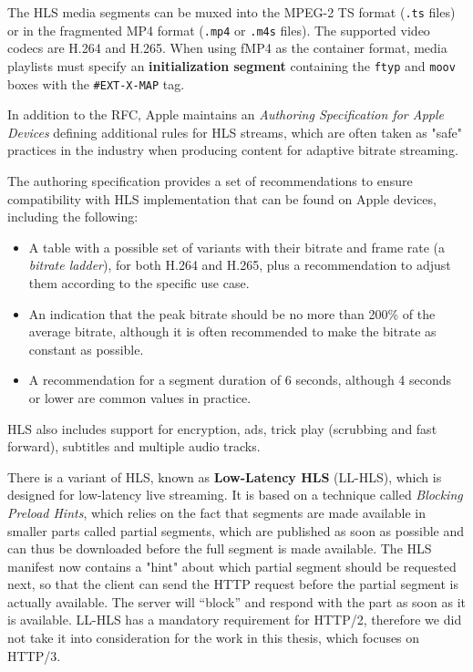 The HLS media segments can be muxed into the MPEG-2 TS format (\texttt{.ts} files) or in the fragmented MP4 format (\texttt{.mp4} or \texttt{.m4s} files). The supported video codecs are H.264 and H.265. When using fMP4 as the container format, media playlists must specify an \textbf{initialization segment} containing the \texttt{ftyp} and \texttt{moov} boxes with the \texttt{\#EXT-X-MAP} tag.

In addition to the RFC, Apple maintains an \textit{Authoring Specification for Apple Devices} defining additional rules for HLS streams, which are often taken as "safe" practices in the industry when producing content for adaptive bitrate streaming.\cite{hlsauthoring}

The authoring specification provides a set of recommendations to ensure compatibility with HLS implementation that can be found on Apple devices, including the following:

\begin{itemize}
    \item A table with a possible set of variants with their bitrate and frame rate (a \textit{bitrate ladder}), for both H.264 and H.265, plus a recommendation to adjust them according to the specific use case.
    \item An indication that the peak bitrate should be no more than 200\% of the average bitrate, although it is often recommended to make the bitrate as constant as possible.\cite{ozer}
    \item A recommendation for a segment duration of 6 seconds, although 4 seconds or lower are common values in practice.\cite{ozer}
\end{itemize}

HLS also includes support for encryption, ads, trick play (scrubbing and fast forward), subtitles and multiple audio tracks.

There is a variant of HLS, known as \textbf{Low-Latency HLS} (LL-HLS), which is designed for low-latency live streaming. It is based on a technique called \textit{Blocking Preload Hints}, which relies on the fact that segments are made available in smaller parts called partial segments, which are published as soon as possible and can thus be downloaded before the full segment is made available. The HLS manifest now contains a "hint" about which partial segment should be requested next, so that the client can send the HTTP request before the partial segment is actually available. The server will “block” and respond with the part as soon as it is available. LL-HLS has a mandatory requirement for HTTP/2, therefore we did not take it into consideration for the work in this thesis, which focuses on HTTP/3.

